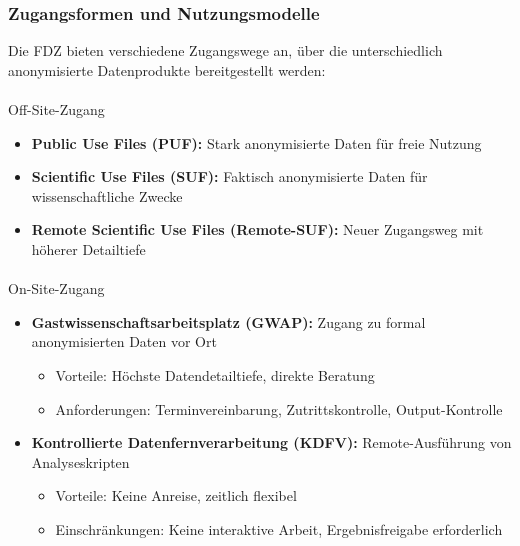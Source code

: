 \documentclass[
  ngerman,
  10pt,
  twocolumn]{article}
\makeatletter
\let\oldparagraph\paragraph
\renewcommand{\paragraph}{
    \@ifstar
      \xxxParagraphStar
      \xxxParagraphNoStar
  }
\newcommand{\xxxParagraphStar}[1]{\oldparagraph*{#1}\mbox{}}
\newcommand{\xxxParagraphNoStar}[1]{\oldparagraph{#1}\mbox{}}
\providecommand{\tightlist}{%
  \setlength{\itemsep}{0pt}\setlength{\parskip}{0pt}}
\makeatother
\begin{document}
\subsubsection{Zugangsformen und
Nutzungsmodelle}\label{zugangsformen-und-nutzungsmodelle}

Die FDZ bieten verschiedene Zugangswege an, über die unterschiedlich
anonymisierte Datenprodukte bereitgestellt werden:

\paragraph{Off-Site-Zugang}\label{off-site-zugang}

\begin{itemize}
\tightlist
\item
  \textbf{Public Use Files (PUF):} Stark anonymisierte Daten für freie
  Nutzung
\item
  \textbf{Scientific Use Files (SUF):} Faktisch anonymisierte Daten für
  wissenschaftliche Zwecke
\item
  \textbf{Remote Scientific Use Files (Remote-SUF):} Neuer Zugangsweg
  mit höherer Detailtiefe
\end{itemize}

\paragraph{On-Site-Zugang}\label{on-site-zugang}

\begin{itemize}
\tightlist
\item
  \textbf{Gastwissenschaftsarbeitsplatz (GWAP):} Zugang zu formal
  anonymisierten Daten vor Ort

  \begin{itemize}
  \tightlist
  \item
    Vorteile: Höchste Datendetailtiefe, direkte Beratung
  \item
    Anforderungen: Terminvereinbarung, Zutrittskontrolle,
    Output-Kontrolle
  \end{itemize}
\item
  \textbf{Kontrollierte Datenfernverarbeitung (KDFV):} Remote-Ausführung
  von Analyseskripten

  \begin{itemize}
  \tightlist
  \item
    Vorteile: Keine Anreise, zeitlich flexibel
  \item
    Einschränkungen: Keine interaktive Arbeit, Ergebnisfreigabe
    erforderlich
  \end{itemize}
\end{itemize}
\end{document}
